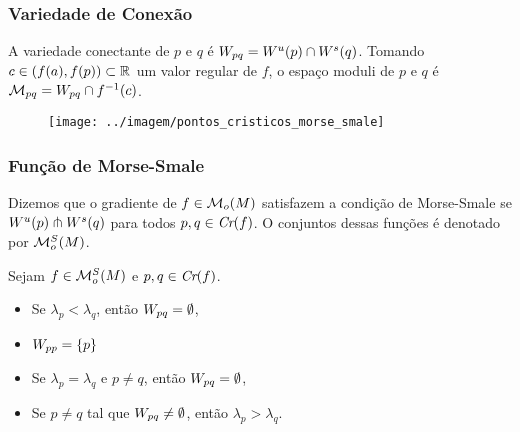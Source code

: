 \documentclass{beamer}
\begin{document}
\begin{footnotesize}
	\begin{frame}
		\frametitle{Variedade de Conexão}
		\begin{definicao}
			A variedade conectante de $p$ e $q$ é $W_{pq} = W^{u}(p)\cap W^{s}(q)$. Tomando $c \in (f(a), f(p)) \subset \mathbb{R}^{}$ um valor regular de $f$, o espaço moduli de $p$ e $q$ é $\mathcal{M}_{pq} = W_{pq}\cap f^{-1}(c)$.
		\end{definicao}
		
		\begin{figure}
			\centering
			\textbf{}\par
			\texttt{[image: ../imagem/pontos\_cristicos\_morse\_smale]}
		\end{figure}
	\end{frame}
	
	\begin{frame}
		\frametitle{Função de Morse-Smale}
		\begin{definicao}
			Dizemos que o gradiente de $f \in \mathcal{M}_{o}(M)$ satisfazem a condição de Morse-Smale se $W^{u}(p)\pitchfork W^{s}(q)$ para todos $p,q \in \textit{Cr}(f)$. O conjuntos dessas funções é denotado por $\mathcal{M}^{S}_{o}(M)$.
		\end{definicao}
			
		\begin{proposicao}
			Sejam $f \in \mathcal{M}^{S}_{o}(M)$ e $p,q \in \textit{Cr}(f)$.
			\begin{itemize}
				\item Se $\lambda_{p}<\lambda_{q}$, então $W_{pq} = \emptyset$,
				
				\item $W_{pp} = \{p\}$
				
				\item Se $\lambda_{p} = \lambda_{q}$ e $p\neq q$, então $W_{pq} = \emptyset$,
				
				\item Se $p \neq q$ tal que $W_{pq} \neq \emptyset$, então $\lambda_{p}>\lambda_{q}$.
			\end{itemize}
		\end{proposicao}
		

\end{frame}
\end{footnotesize}
\end{document}

